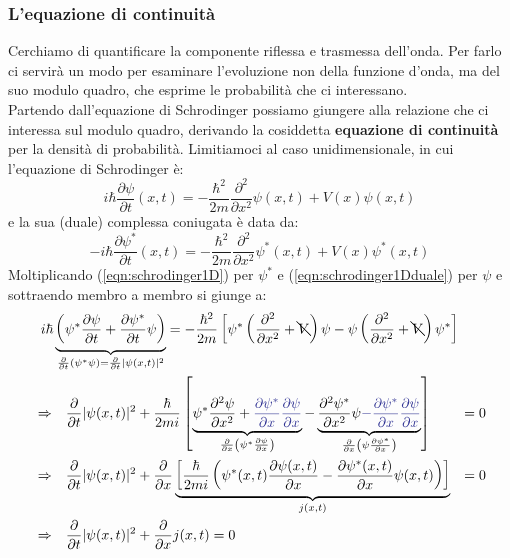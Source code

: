 \documentclass[../../FisicaTeorica.tex]{subfiles}
\begin{document}
\subsubsection{L'equazione di continuità}
Cerchiamo di quantificare la componente riflessa e trasmessa dell'onda. Per farlo ci servirà un modo per esaminare l'evoluzione non della funzione d'onda, ma del suo modulo quadro, che esprime le probabilità che ci interessano.\\
Partendo dall'equazione di Schrodinger possiamo giungere alla relazione che ci interessa sul modulo quadro, derivando la cosiddetta \textbf{equazione di continuità} per la densità di probabilità. Limitiamoci al caso unidimensionale, in cui l'equazione di Schrodinger è: 
\begin{equation}
i\hbar \frac{\partial \psi}{\partial t}(x,t)=-\frac{\hbar^2}{2m}\frac{\partial^2}{\partial x^2}\psi(x,t)+V(x)\psi(x,t)
\label{eqn:schrodinger1D}
\end{equation}
e la sua (duale) complessa coniugata è data da:
\begin{equation}
-i\hbar \frac{\partial \psi^*}{\partial t}(x,t)=-\frac{\hbar^2}{2m}\frac{\partial^2}{\partial x^2}\psi^*(x,t)+V(x)\psi^*(x,t)
\label{eqn:schrodinger1Dduale}
\end{equation}
Moltiplicando (\ref{eqn:schrodinger1D}) per $\psi^*$ e (\ref{eqn:schrodinger1Dduale}) per $\psi$ e sottraendo membro a membro si giunge a:
\begin{align}
\nonumber
\span
i\hbar\underbrace{\left(
\psi^*\frac{\partial \psi}{\partial t}+\frac{\partial \psi^*}{\partial t}\psi
\right)}_{\frac{\partial}{\partial t}(\psi^*\psi)=\frac{\partial }{\partial t}|\psi(x,t)|^2} =-\frac{\hbar^2}{2m}\left [
\psi^*\left(\frac{\partial^2}{\partial x^2}+\bcancel{V}\right) \psi-\psi\left(\frac{\partial^2}{\partial x^2}+\bcancel{V}\right) \psi^*
\right ]\span\span\span\\
\nonumber
&\Rightarrow &&
\frac{\partial}{\partial t}|\psi(x,t)|^2 + \frac{\hbar}{2mi}\left [
\underbrace{\psi^*\frac{\partial^2 \psi}{\partial x^2}
+\textcolor{Blue}{\frac{\partial \psi^*}{\partial x}\frac{\partial \psi}{\partial x}}
}_{\frac{\partial}{\partial x}\left (\psi^* \frac{\partial \psi}{\partial x} \right)}-\underbrace{\frac{\partial^2 \psi^*}{\partial x^2}\psi
 \textcolor{Blue}{-\frac{\partial \psi^*}{\partial x}\frac{\partial \psi}{\partial x}}
 }_{\frac{\partial}{\partial x}\left(\psi\frac{\partial \psi^*}{\partial x}\right)}\right ] &=0\\
\nonumber
&\Rightarrow && \frac{\partial}{\partial t}|\psi(x,t)|^2 +
\frac{\partial}{\partial x}
\underbrace{\left[\frac{\hbar}{2mi}
\left(
\psi^*(x,t)\frac{\partial \psi(x,t)}{\partial x} - \frac{\partial \psi^*(x,t)}{\partial x} \psi(x,t)
 \right) \right]}_{j(x,t)}
 &= 0\\
&\Rightarrow  && \frac{\partial}{\partial t}|\psi(x,t)|^2 +\frac{\partial}{\partial x}j(x,t) = 0 \span
\label{eqn:probability_continuity}
\end{align}
\end{document}
